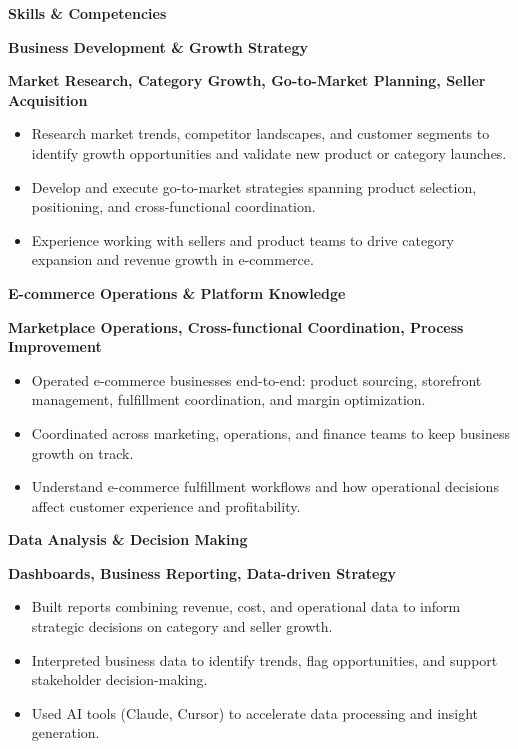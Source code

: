 \documentclass[11pt]{article}
\begin{document}
\newpage
\begin{center}
    \textbf{Skills \& Competencies}
\end{center}

\textbf{Business Development \& Growth Strategy}

\textbf{Market Research, Category Growth, Go-to-Market Planning, Seller Acquisition}
\begin{itemize}[noitemsep, topsep=0pt]
    \item Research market trends, competitor landscapes, and customer segments to identify growth opportunities and validate new product or category launches.
    \item Develop and execute go-to-market strategies spanning product selection, positioning, and cross-functional coordination.
    \item Experience working with sellers and product teams to drive category expansion and revenue growth in e-commerce.
\end{itemize}

\vspace{8pt}

\textbf{E-commerce Operations \& Platform Knowledge}

\textbf{Marketplace Operations, Cross-functional Coordination, Process Improvement}
\begin{itemize}[noitemsep, topsep=0pt]
    \item Operated e-commerce businesses end-to-end: product sourcing, storefront management, fulfillment coordination, and margin optimization.
    \item Coordinated across marketing, operations, and finance teams to keep business growth on track.
    \item Understand e-commerce fulfillment workflows and how operational decisions affect customer experience and profitability.
\end{itemize}
\vspace{8pt}

\textbf{Data Analysis \& Decision Making}

\textbf{Dashboards, Business Reporting, Data-driven Strategy}
\begin{itemize}[noitemsep, topsep=0pt]
    \item Built reports combining revenue, cost, and operational data to inform strategic decisions on category and seller growth.
    \item Interpreted business data to identify trends, flag opportunities, and support stakeholder decision-making.
    \item Used AI tools (Claude, Cursor) to accelerate data processing and insight generation.
\end{itemize}
\end{document}

